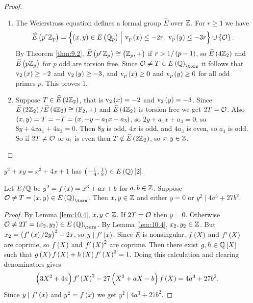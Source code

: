 \begin{proof}
\hfill
\begin{enumerate}
\item The Weierstrass equation defines a formal group $ \widehat{E} $ over $ \mathbb{Z} $. For $ r \ge 1 $ we have
$$ \widehat{E}\br{p^r\ZZ_p} = \cbr{\br{x, y} \in E\br{\QQ_p} \st \v_p\br{x} \le -2r, \ \v_p\br{y} \le -3r} \cup \cbr{\OOO}. $$
By Theorem \ref{thm:9.2}, $ \widehat{E}\br{p^r\ZZ_p} \cong \br{\ZZ_p, +} $ if $ r > 1 / \br{p - 1} $, so $ \widehat{E}\br{4\ZZ_2} $ and $ \widehat{E}\br{p\ZZ_p} $ for $ p $ odd are torsion free. Since $ \OOO \ne T \in E\br{\QQ}_{\tors} $ it follows that $ \v_2\br{x} \ge -2 $ and $ \v_2\br{y} \ge -3 $, and $ \v_p\br{x} \ge 0 $ and $ \v_p\br{y} \ge 0 $ for all odd primes $ p $. This proves $ 1 $.
\item Suppose $ T \in \widehat{E}\br{2\ZZ_2} $, that is $ \v_2\br{x} = -2 $ and $ \v_2\br{y} = -3 $. Since $ \widehat{E}\br{2\ZZ_2} / \widehat{E}\br{4\ZZ_2} \cong \br{\FF_2, +} $ and $ \widehat{E}\br{4\ZZ_2} $ is torsion free we get $ 2T = \mathcal{O} $. Also $ \br{x, y} = T = -T = \br{x, -y - a_1x - a_3} $, so $ 2y + a_1x + a_3 = 0 $, so $ 8y + 4xa_1 + 4a_3 = 0 $. Then $ 8y $ is odd, $ 4x $ is odd, and $ 4a_3 $ is even, so $ a_1 $ is odd. So if $ 2T \ne \mathcal{O} $ or $ a_1 $ is even then $ T \notin \widehat{E}\br{2\ZZ_2} $, so $ x, y \in \mathbb{Z} $.
\end{enumerate}
\end{proof}

\begin{example*}
$ y^2 + xy = x^3 + 4x + 1 $ has $ \br{-\tfrac{1}{4}, \tfrac{1}{8}} \in E\br{\QQ}\sbr{2} $.
\end{example*}


\begin{theorem}
Let $ E / \mathbb{Q} $ be $ y^2 = f\br{x} = x^3 + ax + b $ for $ a, b \in \mathbb{Z} $. Suppose $ \OOO \ne T = \br{x, y} \in E\br{\QQ}_{\tors} $. Then $ x, y \in \mathbb{Z} $ and either $ y = 0 $ or $ y^2 \mid 4a^3 + 27b^2 $.
\end{theorem}

\begin{proof}
By Lemma \ref{lem:10.4}, $ x, y \in \mathbb{Z} $. If $ 2T = \mathcal{O} $ then $ y = 0 $. Otherwise $ \OOO \ne 2T = \br{x_2, y_2} \in E\br{\QQ}_{\tors} $. By Lemma \ref{lem:10.4}, $ x_2, y_2 \in \mathbb{Z} $. But $ x_2 = \br{f'\br{x} / 2y}^2 - 2x $, so $ y \mid f'\br{x} $. Since $ E $ is nonsingular, $ f\br{X} $ and $ f'\br{X} $ are coprime, so $ f\br{X} $ and $ f'\br{X}^2 $ are coprime. Then there exist $ g, h \in \QQ\sbr{X} $ such that $ g\br{X}f\br{X} + h\br{X}f'\br{X}^2 = 1 $. Doing this calculation and clearing denominators gives
$$ \br{3X^2 + 4a}f'\br{X}^2 - 27\br{X^3 + aX - b}f\br{X} = 4a^3 + 27b^2. $$
Since $ y \mid f'\br{x} $ and $ y^2 = f\br{x} $ we get $ y^2 \mid 4a^3 + 27b^2 $.
\end{proof}

